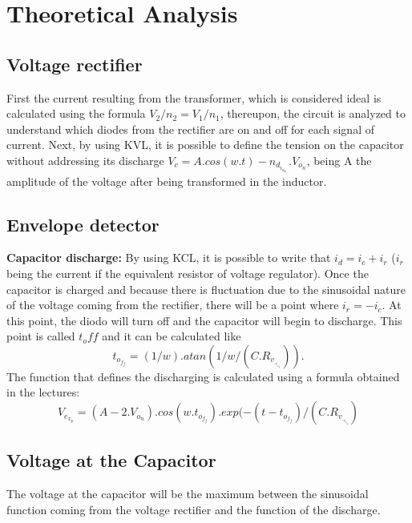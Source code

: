 \section{Theoretical Analysis}
\label{sec:theoretical analysis}

\subsection{Voltage rectifier}
First the current resulting from the transformer, which is considered ideal is calculated using the formula $V_2/n_2=V_1/n_1 $, thereupon, the circuit is analyzed to understand which diodes from the rectifier are on and off for each signal of current. Next, by using KVL, it is possible to define the tension on the capacitor without addressing its discharge $V_c=A.cos(w.t)-n_d_i_o_d_e_s.V_o_n $, being A the amplitude of the voltage after being transformed in the inductor. 

\subsection{Envelope detector}

\textbf{Capacitor discharge:}
By using KCL, it is possible to write that $i_d = i_c + i_r$ ($i_r$ being the current if the equivalent resistor of voltage regulator).
Once the capacitor is charged and because there is fluctuation due to the sinusoidal nature of the voltage coming from the rectifier, there will be a point where $i_r = -i_c$. At this point, the diodo will turn off and the capacitor will begin to discharge. This point is called $t_off$ and it can be calculated like $$ t_o_f_f=(1/w).atan(1/w/(C.R_v_._r_e_g)) .$$ The function that defines the discharging is calculated using a formula obtained in the lectures: $$V_e_x_p=(A-2.V_o_n).cos(w.t_o_f_f).exp(-(t-t_o_f_f)/(C.R_v_._r_e_g)$$




\subsection{Voltage at the Capacitor}

The voltage at the capacitor will be the maximum between the sinusoidal function coming from the voltage rectifier and the function of the discharge.

